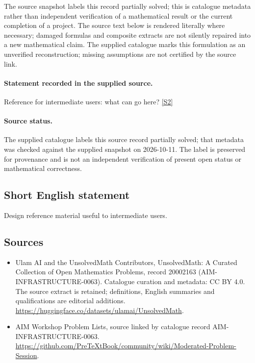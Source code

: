 \documentclass[11pt]{article}
\begin{document}
The source snapshot labels this record partially solved; this is catalogue metadata rather than independent verification of a mathematical result or the current completion of a project.
The source text below is rendered literally where necessary; damaged formulas and composite extracts are not silently repaired into a new mathematical claim.
The supplied catalogue marks this formulation as an unverified reconstruction; missing assumptions are not certified by the source link.
\paragraph{Statement recorded in the supplied source.}
Reference for intermediate users: what can go here? \href{https://github.com/PreTeXtBook/community/wiki/Moderated-Problem-Session}{[S2]}
\paragraph{Source status.}
The supplied catalogue labels this source record partially solved; that metadata was checked against the supplied snapshot on 2026-10-11. The label is preserved for provenance and is not an independent verification of present open status or mathematical correctness.
\subsection{Short English statement}
Design reference material useful to intermediate users.
\subsection{Sources}
\begin{itemize}
\item[S1] Ulam AI and the UnsolvedMath Contributors, UnsolvedMath: A Curated Collection of Open Mathematics Problems, record 20002163 (AIM-INFRASTRUCTURE-0063). Catalogue curation and metadata: CC BY 4.0. The source extract is retained; definitions, English summaries and qualifications are editorial additions.
\url{https://huggingface.co/datasets/ulamai/UnsolvedMath}.
\item[S2] AIM Workshop Problem Lists, source linked by catalogue record AIM-INFRASTRUCTURE-0063.
\url{https://github.com/PreTeXtBook/community/wiki/Moderated-Problem-Session}.
\end{itemize}
\end{document}
